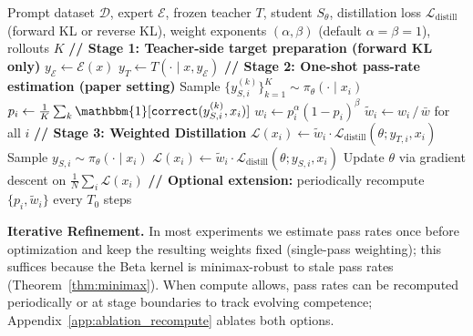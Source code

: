 \documentclass{article}
\begin{document}
\begin{algorithm}[H]
\caption{\textsc{Paced}: Competence-Aware Distillation with Pass-Rate Weighting}
\label{alg:main}
\begin{algorithmic}[1]
\REQUIRE Prompt dataset $\mathcal{D}$, expert $\mathcal{E}$, frozen teacher $T$, student $S_\theta$, distillation loss $\mathcal{L}_{\text{distill}}$ (forward KL or reverse KL), weight exponents $(\alpha, \beta)$ (default $\alpha{=}\beta{=}1$), rollouts $K$
\STATE \textbf{// Stage 1: Teacher-side target preparation (forward KL only)}
\STATE $y_{\mathcal{E}} \leftarrow \mathcal{E}(x)$ \hfill{}
 \STATE $y_{T} \leftarrow T(\cdot \mid x, y_{\mathcal{E}})$ \hfill{}
\ENDFOR
\ENDIF
\STATE \textbf{// Stage 2: One-shot pass-rate estimation (paper setting)}
\STATE Sample $\{y_{S,i}^{(k)}\}_{k=1}^K \sim \pi_\theta(\cdot \mid x_i)$
\STATE $p_i \leftarrow \frac{1}{K}\sum_k \mathbbm{1}[\texttt{correct}(y_{S,i}^{(k)}, x_i)]$
\STATE $w_i \leftarrow p_i^{\alpha}(1-p_i)^{\beta}$ \hfill{}
\ENDFOR
\STATE $\tilde{w}_i \leftarrow w_i \,/\, \bar{w}$ for all $i$ \hfill{}
\STATE \textbf{// Stage 3: Weighted Distillation}
 \STATE $\mathcal{L}(x_i) \leftarrow \tilde{w}_i \cdot \mathcal{L}_{\text{distill}}(\theta; y_{T,i}, x_i)$ \hfill{}
 \ELSE
 \STATE Sample $y_{S,i} \sim \pi_\theta(\cdot \mid x_i)$
 \STATE $\mathcal{L}(x_i) \leftarrow \tilde{w}_i \cdot \mathcal{L}_{\text{distill}}(\theta; y_{S,i}, x_i)$ \hfill{}
 \ENDIF
 \ENDFOR
 \STATE Update $\theta$ via gradient descent on $\frac{1}{N}\sum_i \mathcal{L}(x_i)$
\ENDFOR
\STATE \textbf{// Optional extension:} periodically recompute $\{p_i,\tilde{w}_i\}$ every $T_0$ steps
\end{algorithmic}
\end{algorithm}

\textbf{Iterative Refinement.} In most experiments we estimate pass rates once before optimization and keep the resulting weights fixed (single-pass weighting); this suffices because the Beta kernel is minimax-robust to stale pass rates (Theorem~\ref{thm:minimax}). When compute allows, pass rates can be recomputed periodically or at stage boundaries to track evolving competence; Appendix~\ref{app:ablation_recompute} ablates both options.
\end{document}
